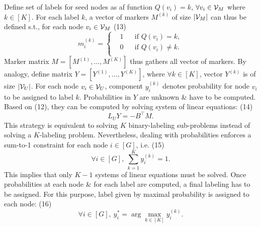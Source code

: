 \documentclass{article}
\begin{document}
\begin{itemize}
\begin{itemize}
        Define set of labels for seed nodes as af function $Q(v_i) = k$, $\forall v_i\in{\cal V}_M$ where $k\in[K]$. For each label $k$, a vector of markers $M^{(k)}$ of size $|{\cal V}_M|$ can thus be defined s.t., for each node $v_i\in{\cal V}_M$ (13)
        \begin{equation*}
            m_i^{(k)} = \left\{\begin{split}
                &1&&\mbox{if } Q(v_i) = k,\\
                &0&&\mbox{if } Q(v_i)\ne k.\\
            \end{split}\right.
        \end{equation*}
        Marker matrix $M = [M^{(1)},\ldots,M^{(K)}]$ thus gathers all vector of markers. By analogy, define matrix $Y = [Y^{(1)},\ldots,Y^{(K)}]$, where $\forall k\in[K]$, vector $Y^{(k)}$ is of size $|{\cal V}_U|$. For each node $v_i\in{\cal V}_U$, component $y_i^{(k)}$ denotes probability for node $v_i$ to be assigned to label $k$. Probabilities in $Y$ are unknown \& have to be computed. Based on (12), they can be computed by solving system of linear equations: (14)
        \begin{equation*}
            L_UY = -B^\top M.
        \end{equation*}
        This strategy is equivalent to solving $K$ binary-labeling sub-problems instead of solving a $K$-labeling problem. Nevertheless, dealing with probabilities enforces a sum-to-1 constraint for each node $i\in[G]$, i.e. (15)
        \begin{equation*}
            \forall i\in[G],\ \sum_{k=1}^K y_i^{(k)} = 1.
        \end{equation*}
        This implies that only $K - 1$ systems of linear equations must be solved. Once probabilities at each node \& for each label are computed, a final labeling has to be assigned. For this purpose, label given by maximal probability is assigned to each node: (16)
        \begin{equation*}
            \forall i\in[G],\ y_i^* = \arg\max_{k\in[K]} y_i^{(k)}.
        \end{equation*}

\end{itemize}
\end{itemize}
\end{document}
